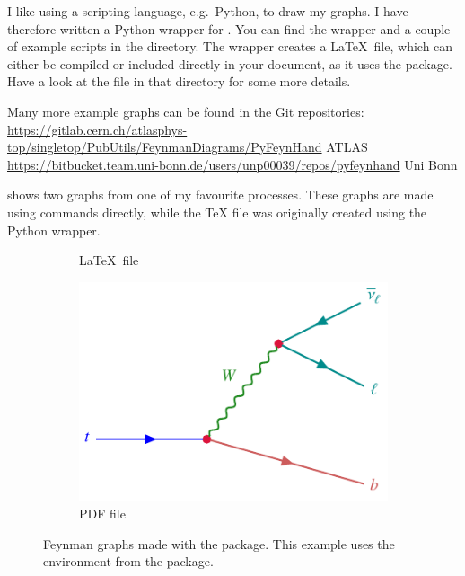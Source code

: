 I like using a scripting language, e.g.\ Python, to draw my graphs.
I have therefore written a Python wrapper for .
You can find the wrapper and a couple of example scripts in the  directory.
The wrapper creates a \LaTeX\ file,
which can either be compiled or included directly in your document,
as it uses the  package.
Have a look at the  file in that directory for some more details.

Many more example graphs can be found in the Git repositories:\\
{\footnotesize\url{https://gitlab.cern.ch/atlasphys-top/singletop/PubUtils/FeynmanDiagrams/PyFeynHand}} ATLAS\\
{\footnotesize\url{https://bitbucket.team.uni-bonn.de/users/unp00039/repos/pyfeynhand}} Uni Bonn

 shows two graphs from one of my favourite processes.
These graphs are made using  commands directly,
while the \TeX{} file was originally created using the Python wrapper.

\begin{figure}[htbp]
\begin{tcblisting}{}
\centering
\begin{subfigure}{0.5\figwidth}
  \centering
  
  \caption{\LaTeX\ file}%
  \label{fig:feyn:tdecay1}
\end{subfigure}
\qquad
\begin{subfigure}{0.5\figwidth}
  \centering
  \includegraphics[width=0.5\figwidth]{../tikz/tdecay}
  \caption{PDF file}%
  \label{fig:feyn:tdecay2}
\end{subfigure}
\caption{Feynman graphs made with the  package.
  This example uses the  environment from the  package.}%
\label{fig:feyn:tdecay}
\end{tcblisting}
\end{figure}

